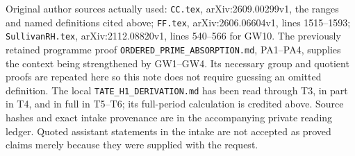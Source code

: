 Original author sources actually used: \nolinkurl{CC.tex},
arXiv:2609.00299v1, the ranges and named definitions cited above;
\nolinkurl{FF.tex}, arXiv:2606.06604v1, lines 1515--1593;
\nolinkurl{SullivanRH.tex}, arXiv:2112.08820v1, lines 540--566 for GW10.
The previously retained programme proof
\nolinkurl{ORDERED_PRIME_ABSORPTION.md}, PA1--PA4, supplies the context
being strengthened by GW1--GW4. Its necessary group and quotient proofs
are repeated here so this note does not require guessing an omitted
definition. The local \nolinkurl{TATE_H1_DERIVATION.md} has been read
through T3, in part in T4, and in full in T5--T6; its full-period
calculation is credited above. Source hashes and exact intake provenance
are in the accompanying private reading ledger. Quoted assistant
statements in the intake are not accepted as proved claims merely
because they were supplied with the request.

